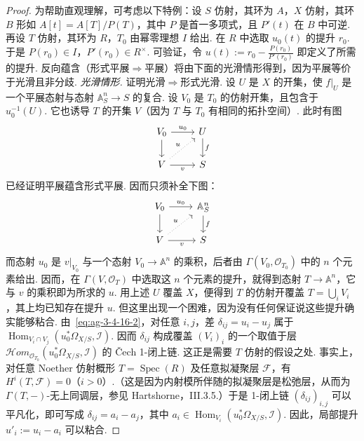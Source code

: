 \begin{proof}
为帮助直观理解，可考虑以下特例：设 $S$ 仿射，其环为 $A$，$X$ 仿射，其环 $B$ 形如 $A[t]=A[T]/P(T)$，其中 $P$ 是首一多项式，且 $P'(t)$ 在 $B$ 中可逆. 再设 $T$ 仿射，其环为 $R$，$T_0$ 由幂零理想 $I$ 给出. 在 $R$ 中选取 $u_0(t)$ 的提升 $r_0$. 于是 $P(r_0)\in I$，$P'(r_0)\in R^\times$. 可验证，令 $u(t):=r_0-\frac{P(r_0)}{P'(r_0)}$ 即定义了所需的提升.
反向蕴含（形式平展$\Rightarrow$平展）将由下面的光滑情形得到，因为平展等价于光滑且非分歧.
\emph{光滑情形.} 证明光滑$\Rightarrow$形式光滑. 设 $U$ 是 $X$ 的开集，使 $f|_U$ 是一个平展态射与态射 $\mathbb A_S^n\longrightarrow S$ 的复合. 设 $V_0$ 是 $T_0$ 的仿射开集，且包含于 $u_0^{-1}(U)$. 它也诱导 $T$ 的开集 $V$（因为 $T$ 与 $T_0$ 有相同的拓扑空间）. 此时有图
\begin{align*}
\begin{tikzcd}[ampersand replacement=\&]
V_0\arrow[r,"u_0"]\arrow[d] \& U\arrow[d,"f"]\\
V\arrow[r,"v"']\arrow[ur,dotted,"u"] \& S
\end{tikzcd}
\end{align*}
已经证明平展蕴含形式平展. 因而只须补全下图：
\begin{align*}
\begin{tikzcd}[ampersand replacement=\&]
V_0\arrow[r,"u_0"]\arrow[d] \& \mathbb A_S^n\arrow[d,"f"]\\
V\arrow[r,"v"']\arrow[ur,dotted,"u"] \& S
\end{tikzcd}
\end{align*}
而态射 $u_0$ 是 $v|_{V_0}$ 与一个态射 $V_0\longrightarrow\mathbb A^n$ 的乘积，后者由 $\Gamma(V_0,\mathcal O_{T_0})$ 中的 $n$ 个元素给出. 因而，在 $\Gamma(V,\mathcal O_T)$ 中选取这 $n$ 个元素的提升，就得到态射 $T\longrightarrow\mathbb A^n$，它与 $v$ 的乘积即为所求的 $u$.
用上述 $U$ 覆盖 $X$，便得到 $T$ 的仿射开覆盖 $T=\bigcup_iV_i$，其上均已知存在提升 $u$. 但这里出现一个困难，因为没有任何保证说这些提升确实能够粘合. 由~\eqref{eq:ag-3-4-16-2}，对任意 $i,j$，差 $\delta_{ij}=u_i-u_j$ 属于 $\operatorname{Hom}_{V_i\cap V_j}(u_0^*\Omega_{X/S},\mathcal I)$. 因而 $\delta_{ij}$ 构成覆盖
$(V_i)_i$ 的一个取值于层 $\mathcal H om_{\mathcal O_{T_0}}(u_0^*\Omega_{X/S},\mathcal I)$ 的 Čech 1-闭上链. 这正是需要 $T$ 仿射的假设之处. 事实上，对任意 Noether 仿射概形 $T=\operatorname{Spec}(R)$ 及任意拟凝聚层 $\mathcal F$，有 $H^i(T,\mathcal F)=0$（$i>0$）.（这是因为内射模所伴随的拟凝聚层是松弛层，从而为 $\Gamma(T,-)$-无上同调层，参见 Hartshorne，III.3.5.）于是 1-闭上链 $(\delta_{ij})_{i,j}$ 可以平凡化，即可写成 $\delta_{ij}=a_i-a_j$，其中 $a_i\in\operatorname{Hom}_{V_i}(u_0^*\Omega_{X/S},\mathcal I)$. 因此，局部提升 $u'_i:=u_i-a_i$ 可以粘合.

\end{proof}
